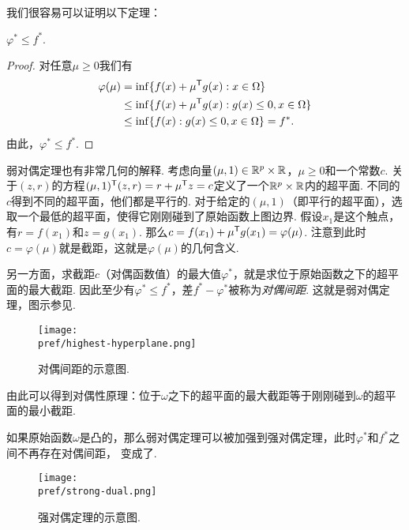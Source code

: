 我们很容易可以证明以下定理：

\begin{theorem}[弱对偶定理]\label{thm:weak-dual}
    $\varphi^\ast\le f^\ast$.
\end{theorem}

\begin{proof}
    对任意${\mu \ge 0}$我们有
    \begin{align*}
        \varphi({\mu}) &=\inf\{f({x})+{\mu^{\mathsf{T}} g(x):x}\in\Omega\} \\
        & \le \inf\{f({x})+{\mu^{\mathsf{T}} g(x):g(x)\le 0,x}\in\Omega\} \\
        & \le \inf\{f({x}):{g(x)\le 0, x}\in\Omega\}=f^\ast.
    \end{align*}
    由此，$\varphi^\ast\le f^\ast$. 
\end{proof}

弱对偶定理也有非常几何的解释. 考虑向量$(\mu,1)\in \mathbb{R}^{p}\times\mathbb{R}$，${\mu}\ge{0}$和一个常数$c$. 关于$(z,r)$的方程$({\mu},1)^{\mathsf{T}} (z,r)=r+{\mu^{\mathsf{T}} z}=c$定义了一个$\mathbb{R}^{p}\times\mathbb{R}$内的超平面. 不同的$c$得到不同的超平面，他们都是平行的. 对于给定的$({\mu},1)$（即平行的超平面），选取一个最低的超平面，使得它刚刚碰到了原始函数上图边界. 假设${x_1}$是这个触点，有$r=f(x_1)$和$z=g(x_1)$. 那么$c=f({x_1})+{\mu^{\mathsf{T}} g(x_1)}=\varphi({\mu})$. 注意到此时$c=\varphi({\mu})$就是截距，这就是$\varphi(\mu)$的几何含义.

另一方面，求截距$c$（对偶函数值）的最大值$\varphi^*$，就是求位于原始函数之下的超平面的最大截距. 因此至少有$\varphi^*\leq f^*$，差$f^*-\varphi^*$被称为\emph{对偶间距}. 这就是弱对偶定理，图示参见.

\begin{figure}
    \centering
    \texttt{[image: \\pref/highest-hyperplane.png]}
    \caption{对偶间距的示意图.}
    \label{fig:highest-hyperplane}
\end{figure}

由此可以得到对偶性原理：位于$\omega$之下的超平面的最大截距等于刚刚碰到$\omega$的超平面的最小截距.

如果原始函数$\omega$是凸的，那么弱对偶定理可以被加强到强对偶定理，此时$\varphi^*$和$f^\ast$之间不再存在对偶间距， 变成了.

\begin{figure}
    \centering
    \texttt{[image: \\pref/strong-dual.png]}
    \caption{强对偶定理的示意图.}
    \label{fig:strong-dual}
\end{figure}

